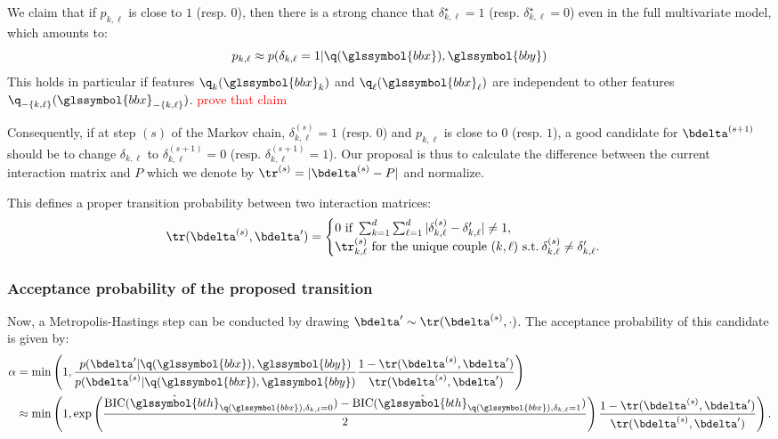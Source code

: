 We claim that if $p_{k,\ell}$ is close to $1$ (resp. $0$), then there is a strong chance that $\delta_{k,\ell}^\star = 1$ (resp. $\delta_{k,\ell}^\star = 0$) even in the full multivariate model, which amounts to:
\[ p_{k,\ell} \approx p(\delta_{k,\ell} = 1 | \q(\glssymbol{bbx}),\glssymbol{bby}) \]
This holds in particular if features $\q_k(\glssymbol{bbx}_k)$ and $\q_\ell(\glssymbol{bbx}_\ell)$ are independent to other features $\q_{-\{k,\ell\}}(\glssymbol{bbx}_{-\{k,\ell\}})$.  \textcolor{red}{prove that claim}

Consequently, if at step $(s)$ of the Markov chain, $\delta_{k,\ell}^{(s)} = 1$ (resp. $0$) and $p_{k,\ell}$ is close to $0$ (resp. $1$), a good candidate for $\bdelta^{(s+1)}$ should be to change $\delta_{k,\ell}$ to $\delta_{k,\ell}^{(s+1)} = 0$ (resp. $\delta_{k,\ell}^{(s+1)} = 1$). Our proposal is thus to calculate the difference between the current interaction matrix and $P$ which we denote by $\tr^{(s)} = |\bdelta^{(s)} - P|$ and normalize.

This defines a proper transition probability between two interaction matrices:
\[ \tr(\bdelta^{(s)},\bdelta') = \begin{cases} 0 \text{ if } \sum_{k=1}^d \sum_{\ell=1}^d |\delta^{(s)}_{k,\ell} - \delta_{k,\ell}'| \neq 1, \\ \tr^{(s)}_{k,\ell} \text{ for the unique couple } (k,\ell) \text{ s.t.} \: \delta^{(s)}_{k,\ell} \neq \delta_{k,\ell}'. \end{cases} \]

\subsubsection{Acceptance probability of the proposed transition}


Now, a Metropolis-Hastings step can be conducted by drawing $\bdelta' \sim \tr(\bdelta^{(s)},\cdot)$. The acceptance probability of this candidate is given by:
\begin{align*}
\alpha & = \min \left( 1, \frac{p(\bdelta' | \q(\glssymbol{bbx}), \glssymbol{bby})}{p(\bdelta^{(s)} | \q(\glssymbol{bbx}), \glssymbol{bby})} \frac{1-\tr(\bdelta^{(s)},\bdelta')}{\tr(\bdelta^{(s)},\bdelta')} \right) \\
& \approx \min \left( 1, \exp \left( \frac{\text{BIC}(\hat{\glssymbol{bth}}_{\q(\glssymbol{bbx}),\delta_{k,\ell}=0}) - \text{BIC}(\hat{\glssymbol{bth}}_{\q(\glssymbol{bbx}),\delta_{k,\ell}=1})}{2} \right) \frac{1-\tr(\bdelta^{(s)},\bdelta')}{\tr(\bdelta^{(s)},\bdelta')} \right).
\end{align*}

